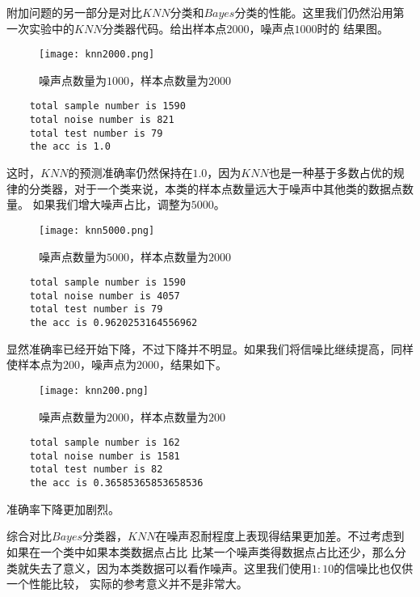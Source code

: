 \documentclass{article}
\begin{document}
附加问题的另一部分是对比$KNN$分类和$Bayes$分类的性能。这里我们仍然沿用第一次实验中的$KNN$分类器代码。给出样本点$2000$，噪声点$1000$时的
结果图。
\begin{figure}[H]
    \centering
    \begin{minipage}[t]{1.0\linewidth}
        \centering
        \texttt{[image: knn2000.png]}
        \caption{噪声点数量为$1000$，样本点数量为$2000$}
    \end{minipage}
 \end{figure}
 \begin{verbatim}
    total sample number is 1590
    total noise number is 821
    total test number is 79
    the acc is 1.0
 \end{verbatim}
 这时，$KNN$的预测准确率仍然保持在$1.0$，因为$KNN$也是一种基于多数占优的规律的分类器，对于一个类来说，本类的样本点数量远大于噪声中其他类的数据点数量。
 如果我们增大噪声占比，调整为$5000$。
 \begin{figure}[H]
    \centering
    \begin{minipage}[t]{1.0\linewidth}
        \centering
        \texttt{[image: knn5000.png]}
        \caption{噪声点数量为$5000$，样本点数量为$2000$}
    \end{minipage}
 \end{figure}
 \begin{verbatim}
    total sample number is 1590
    total noise number is 4057
    total test number is 79
    the acc is 0.9620253164556962
 \end{verbatim}
 显然准确率已经开始下降，不过下降并不明显。如果我们将信噪比继续提高，同样使样本点为$200$，噪声点为$2000$，结果如下。
 \begin{figure}[H]
    \centering
    \begin{minipage}[t]{1.0\linewidth}
        \centering
        \texttt{[image: knn200.png]}
        \caption{噪声点数量为$2000$，样本点数量为$200$}
    \end{minipage}
 \end{figure}
 \begin{verbatim}
    total sample number is 162
    total noise number is 1581
    total test number is 82
    the acc is 0.36585365853658536
 \end{verbatim}
 准确率下降更加剧烈。
 
 
 综合对比$Bayes$分类器，$KNN$在噪声忍耐程度上表现得结果更加差。不过考虑到如果在一个类中如果本类数据点占比
 比某一个噪声类得数据点占比还少，那么分类就失去了意义，因为本类数据可以看作噪声。这里我们使用$1:10$的信噪比也仅供一个性能比较，
 实际的参考意义并不是非常大。
\end{document}

